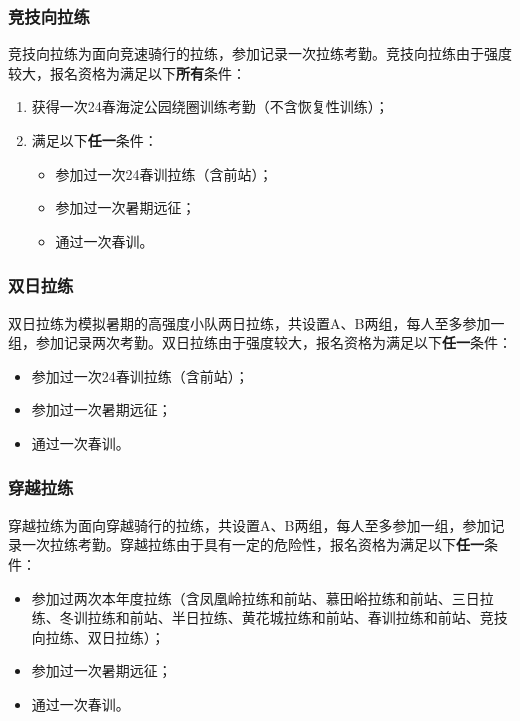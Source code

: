 \documentclass[UTF8]{ctexart}
\begin{document}
\subsubsection{竞技向拉练}

竞技向拉练为面向竞速骑行的拉练，参加记录一次拉练考勤。竞技向拉练由于强度较大，报名资格为满足以下\textbf{所有}条件：
\begin{enumerate}[nosep,left=4em]
    \item 获得一次24春海淀公园绕圈训练考勤（不含恢复性训练）；
    \item 满足以下\textbf{任一}条件：
    \begin{itemize}[nosep,left=1em]
        \item 参加过一次24春训拉练（含前站）；
        \item 参加过一次暑期远征；
        \item 通过一次春训。
    \end{itemize}
\end{enumerate}

\subsubsection{双日拉练}

双日拉练为模拟暑期的高强度小队两日拉练，共设置A、B两组，每人至多参加一组，参加记录两次考勤。双日拉练由于强度较大，报名资格为满足以下\textbf{任一}条件：
\begin{itemize}[nosep,left=4em]
    \item 参加过一次24春训拉练（含前站）；
    \item 参加过一次暑期远征；
    \item 通过一次春训。
\end{itemize}

\subsubsection{穿越拉练}

穿越拉练为面向穿越骑行的拉练，共设置A、B两组，每人至多参加一组，参加记录一次拉练考勤。穿越拉练由于具有一定的危险性，报名资格为满足以下\textbf{任一}条件：
\begin{itemize}[nosep,left=4em]
    \item 参加过两次本年度拉练（含凤凰岭拉练和前站、慕田峪拉练和前站、三日拉练、冬训拉练和前站、半日拉练、黄花城拉练和前站、春训拉练和前站、竞技向拉练、双日拉练）；
    \item 参加过一次暑期远征；
    \item 通过一次春训。
\end{itemize}
\end{document}
